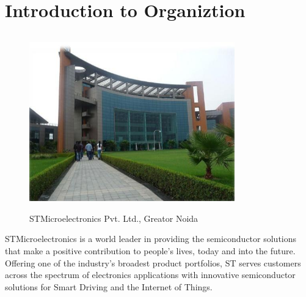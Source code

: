 \chapter{Introduction to Organiztion}
\begin{figure}[ht]
	\centering
	\includegraphics[width=3.5in, height=3in]{images/company.jpg}
	\caption{STMicroelectronics Pvt. Ltd., Greator Noida}
\end{figure}
\noindent STMicroelectronics is a world leader in providing the semiconductor solutions that make a positive contribution to people's lives, today and into the future.\\
\noindent Offering one of the industry's broadest product portfolios, ST serves customers across the spectrum of electronics applications with innovative semiconductor solutions for Smart Driving and the Internet of Things. %
